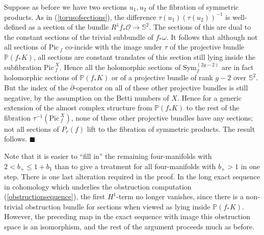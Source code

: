 \documentclass[10pt]{article}
\newcommand{\pp}{\mathbb{P}}
\newcommand{\sss}{\mathbb{S}}
\newcommand{\cdbar}{\overline{\partial}}
\newcommand{\Sym}{\mathrm{Sym}}
\newcommand{\Pic}{\mathrm{Pic \,}}
\newenvironment{Pf}{\par \noindent{\sc Proof:} }{\quad $\blacksquare$ \par
\vspace{0.5cm}}
\begin{document}
\begin{Pf}
Suppose as before we have two sections $u_1, u_2$ of the fibration of
symmetric products.  As in (\ref{torusofsections}), the difference
$\tau(u_1) (\tau(u_2))^{-1}$  is well-defined 
as a section of the bundle $R^1 f_* \mathcal{O} \rightarrow \sss^2$.
The sections of this are dual to the constant sections of the trivial
subbundle of $f_* \omega$.  It follows that although not all sections
of $\Pic_f$ co-incide with the image under $\tau$ of the projective
bundle $\pp(f_* K)$, all sections are constant translates of this
section still lying inside the subfibration $\Pic_f ^X$.
Hence all the holomorphic sections of $\Sym^{(2g-2)}_f$ are in fact
holomorphic sections of $\pp (f_* K)$ or of a projective bundle of
rank $g-2$ over $\sss^2$.  But the index of the $\cdbar$-operator on
all of these other projective bundles is still negative, by the
assumption on the Betti numbers of $X$.  Hence for a generic extension
of the almost complex structure from $\pp (f_* K)$ to the rest of the
fibration $\tau^{-1} (\Pic_f ^X)$, none of these other projective
bundles have any sections; not all sections of $P_r(f)$ lift to the
fibration of symmetric products.  The result follows.
\end{Pf}

\noindent Note that it is easier to ``fill in'' the remaining
four-manifolds with $2< b_+ \leq 1+b_1$ than to give a treatment for
all four-manifolds with $b_+ > 1$ in one step.  There is one last
alteration required in the proof.
In the long exact sequence in cohomology which underlies the
obstruction computation (\ref{obstructionsequence}), the first
$H^1$-term no longer vanishes,
  since there is a non-trivial obstruction bundle for sections when
  viewed as lying inside $\pp (f_* K)$.  However, the preceding map in
  the exact sequence with image this obstruction space is an
  isomorphism, and the
  rest of the argument proceeds much as before.   




\end{document}
